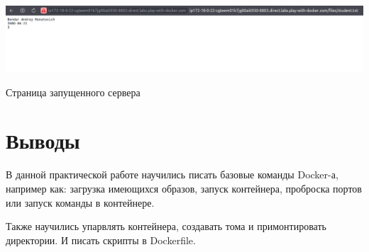 \begin{image}
	\includegraphics[width=1\textwidth]{Screenshot from 2023-04-15 21-27-44}
	\caption{Страница запущенного сервера}
	\label{fig:indvar:page}
\end{image}

\clearpage

\section*{\LARGE Выводы}
В данной практической работе научились писать базовые команды Docker-а,
например как: загрузка имеющихся образов, запуск контейнера, проброска
портов или запуск команды в контейнере.\par
Также научились упарвлять контейнера, создавать тома и примонтировать
директории. И писать скрипты в Dockerfile.

